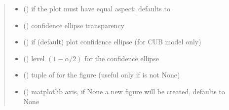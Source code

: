 \documentclass[letterpaper,10pt,english]{sphinxmanual}
\begin{document}
\begin{fulllineitems}
\begin{quote}
\begin{description}
\begin{itemize}
\item {} 
\sphinxAtStartPar
{} () \textendash{} if the plot must have equal aspect; defaults to 

\item {} 
\sphinxAtStartPar
{} () \textendash{} confidence ellipse transparency

\item {} 
\sphinxAtStartPar
{} () \textendash{} if  (default) plot confidence ellipse (for CUB model only)

\item {} 
\sphinxAtStartPar
{} () \textendash{} level \((1-\alpha/2)\) for the confidence ellipse

\item {} 
\sphinxAtStartPar
{} () \textendash{} tuple of  for the figure (useful only if  is not None)

\item {} 
\sphinxAtStartPar
{} (\sphinxstyleliteralemphasis{\sphinxupquote{, }}) \textendash{} matplotlib axis, if None a new figure will be created, defaults to None

\end{itemize}

\sphinxAtStartPar
{}

\end{description}\end{quote}

\end{fulllineitems}

\end{document}
